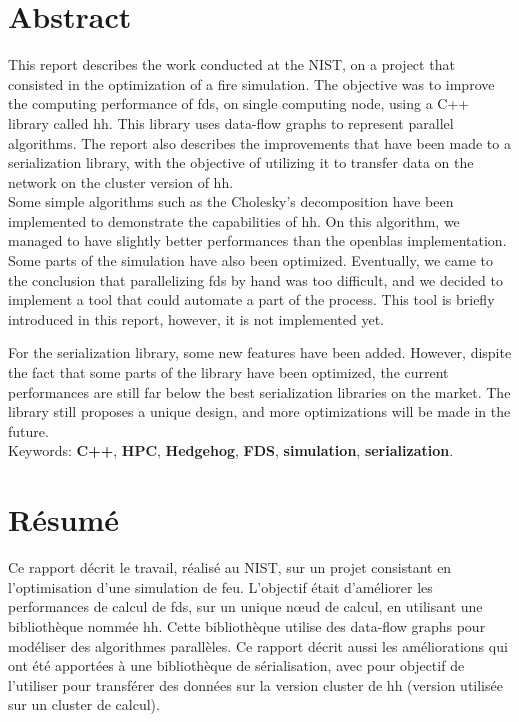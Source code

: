 
\clearpage{}
\section*{Abstract}

This report describes the work conducted at the NIST, on a project that
consisted in the optimization of a fire simulation. The objective was to improve
the computing performance of \gls{fds}, on single computing node, using a C++
library called \gls{hh}. This library uses data-flow graphs to represent
parallel algorithms. The report also describes the improvements that have been
made to a serialization library, with the objective of utilizing it to transfer
data on the network on the cluster version of \gls{hh}.\\

Some simple algorithms such as the Cholesky's decomposition have been
implemented to demonstrate the capabilities of \gls{hh}. On this algorithm, we
managed to have slightly better performances than the openblas implementation.
Some parts of the simulation have also been optimized. Eventually, we came to
the conclusion that parallelizing \gls{fds} by hand was too difficult, and we
decided to implement a tool that could automate a part of the process. This tool
is briefly introduced in this report, however, it is not implemented yet.

For the serialization library, some new features have been added. However,
dispite the fact that some parts of the library have been optimized, the current
performances are still far below the best serialization libraries on the
market. The library still proposes a unique design, and more optimizations will
be made in the future.\\

Keywords: \textbf{C++}, \textbf{HPC}, \textbf{Hedgehog}, \textbf{FDS},
\textbf{simulation}, \textbf{serialization}.

\section*{Résumé}

Ce rapport décrit le travail, réalisé au NIST, sur un projet consistant en
l'optimisation d'une simulation de feu. L'objectif était d'améliorer les
performances de calcul de \gls{fds}, sur un unique nœud de calcul, en utilisant
une bibliothèque nommée \gls{hh}. Cette bibliothèque utilise des data-flow
graphs pour modéliser des algorithmes parallèles. Ce rapport décrit aussi les
améliorations qui ont été apportées à une bibliothèque de sérialisation, avec
pour objectif de l'utiliser pour transférer des données sur la version cluster
de \gls{hh} (version utilisée sur un cluster de calcul).\\

